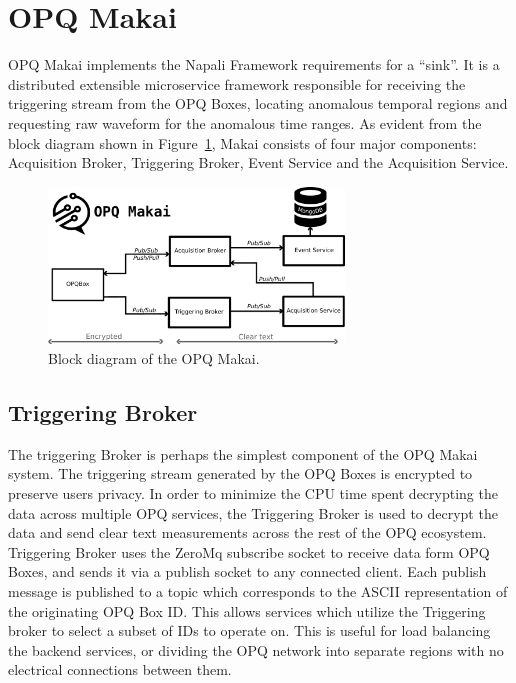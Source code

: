 \section{OPQ Makai}\label{sec:opq-makai}

OPQ Makai implements the Napali Framework requirements for a ``sink''.
 It is a distributed extensible microservice framework responsible for receiving the triggering stream from the OPQ Boxes, locating anomalous temporal regions and requesting raw waveform for the anomalous time ranges.
 As evident from the block diagram shown in Figure~\ref{fig:opq:10}, Makai consists of four major components: Acquisition Broker, Triggering Broker, Event Service and the Acquisition Service.
\begin{figure}[h]
  \begin{center}
  \includegraphics[width=0.7\textwidth]{img/makai_main.pdf}
  \end{center}
  \caption{Block diagram of the OPQ Makai.}
  \label{fig:opq:10}
\end{figure}

\subsection{Triggering Broker}\label{subsec:triggering-broker}

The triggering Broker is perhaps the simplest component of the OPQ Makai system.
The triggering stream generated by the OPQ Boxes is encrypted to preserve users privacy.
In order to minimize the CPU time spent decrypting the data across multiple OPQ services, the Triggering Broker is used to decrypt the data and send clear text measurements across the rest of the OPQ ecosystem.
Triggering Broker uses the ZeroMq subscribe socket to receive data form OPQ Boxes, and sends it via a publish socket to any connected client.
Each publish message is published to a topic which corresponds to the ASCII representation of the originating OPQ Box ID.
This allows services which utilize the Triggering broker to select a subset of IDs to operate on.
This is useful for load balancing the backend services, or dividing the OPQ network into separate regions with no electrical connections between them.

